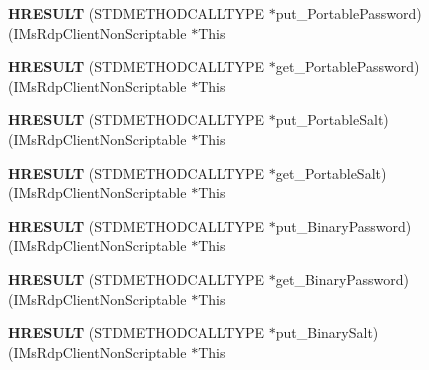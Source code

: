 \begin{DoxyCompactItemize}
\item 
\mbox{\label{struct_i_ms_rdp_client_non_scriptable_vtbl_a5128a57b56640bc04a95f0229738a1b4}} 
{\bfseries H\+R\+E\+S\+U\+LT} (S\+T\+D\+M\+E\+T\+H\+O\+D\+C\+A\+L\+L\+T\+Y\+PE $\ast$put\+\_\+\+Portable\+Password)(I\+Ms\+Rdp\+Client\+Non\+Scriptable $\ast$This
\item 
\mbox{\label{struct_i_ms_rdp_client_non_scriptable_vtbl_a1a17c904b90f563d2fd7deb645f700dd}} 
{\bfseries H\+R\+E\+S\+U\+LT} (S\+T\+D\+M\+E\+T\+H\+O\+D\+C\+A\+L\+L\+T\+Y\+PE $\ast$get\+\_\+\+Portable\+Password)(I\+Ms\+Rdp\+Client\+Non\+Scriptable $\ast$This
\item 
\mbox{\label{struct_i_ms_rdp_client_non_scriptable_vtbl_a00be72b704708c86939191aac98c089e}} 
{\bfseries H\+R\+E\+S\+U\+LT} (S\+T\+D\+M\+E\+T\+H\+O\+D\+C\+A\+L\+L\+T\+Y\+PE $\ast$put\+\_\+\+Portable\+Salt)(I\+Ms\+Rdp\+Client\+Non\+Scriptable $\ast$This
\item 
\mbox{\label{struct_i_ms_rdp_client_non_scriptable_vtbl_a072130f03f6ffc2b4e37aca9f1cb635c}} 
{\bfseries H\+R\+E\+S\+U\+LT} (S\+T\+D\+M\+E\+T\+H\+O\+D\+C\+A\+L\+L\+T\+Y\+PE $\ast$get\+\_\+\+Portable\+Salt)(I\+Ms\+Rdp\+Client\+Non\+Scriptable $\ast$This
\item 
\mbox{\label{struct_i_ms_rdp_client_non_scriptable_vtbl_a3c831f112e17220426e5e20d9b151d37}} 
{\bfseries H\+R\+E\+S\+U\+LT} (S\+T\+D\+M\+E\+T\+H\+O\+D\+C\+A\+L\+L\+T\+Y\+PE $\ast$put\+\_\+\+Binary\+Password)(I\+Ms\+Rdp\+Client\+Non\+Scriptable $\ast$This
\item 
\mbox{\label{struct_i_ms_rdp_client_non_scriptable_vtbl_a897ae9dafa0ba3316f4d96f213af8e2d}} 
{\bfseries H\+R\+E\+S\+U\+LT} (S\+T\+D\+M\+E\+T\+H\+O\+D\+C\+A\+L\+L\+T\+Y\+PE $\ast$get\+\_\+\+Binary\+Password)(I\+Ms\+Rdp\+Client\+Non\+Scriptable $\ast$This
\item 
\mbox{\label{struct_i_ms_rdp_client_non_scriptable_vtbl_ab1c125fc6f8a78cab609cd248bce88d5}} 
{\bfseries H\+R\+E\+S\+U\+LT} (S\+T\+D\+M\+E\+T\+H\+O\+D\+C\+A\+L\+L\+T\+Y\+PE $\ast$put\+\_\+\+Binary\+Salt)(I\+Ms\+Rdp\+Client\+Non\+Scriptable $\ast$This

\end{DoxyCompactItemize}

